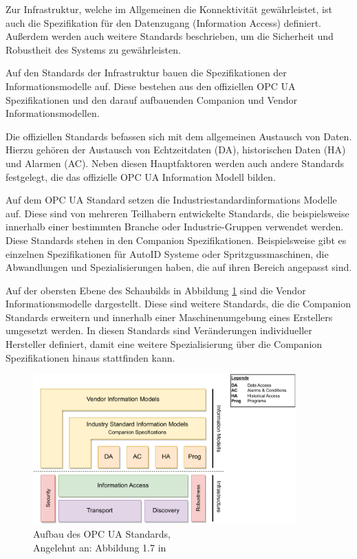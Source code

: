 \documentclass[a4paper, 12pt, oneside, toc=listofnumbered, bibliography=totoc]{scrbook}
\begin{document}
		Zur Infrastruktur, welche im Allgemeinen die Konnektivität gewährleistet, ist auch die Spezifikation für den Datenzugang (Information Access) definiert. Außerdem werden auch weitere Standards beschrieben, um die Sicherheit und Robustheit des Systems zu gewährleisten.
		
		Auf den Standards der Infrastruktur bauen die Spezifikationen der Informationsmodelle auf. Diese bestehen aus den offiziellen OPC UA Spezifikationen und den darauf aufbauenden Companion und Vendor Informationsmodellen. \cite{mahnke_opc_2009}
		
		Die offiziellen Standards befassen sich mit dem allgemeinen Austausch von Daten. Hierzu gehören der Austausch von Echtzeitdaten (DA), historischen Daten (HA) und Alarmen (AC). Neben diesen Hauptfaktoren werden auch andere Standards festgelegt, die das offizielle OPC UA Information Modell bilden. \cite{mahnke_opc_2009, rinke_was_2022}
		
		Auf dem OPC UA Standard setzen die Industriestandardinformations Modelle auf. Diese sind von mehreren Teilhabern entwickelte Standards, die beispielsweise innerhalb einer bestimmten Branche oder Industrie-Gruppen verwendet werden. Diese Standards stehen in den Companion Spezifikationen. Beispielsweise gibt es einzelnen Spezifikationen für AutoID Systeme oder Spritzgussmaschinen, die Abwandlungen und Spezialisierungen haben, die auf ihren Bereich angepasst sind. \cite{mahnke_opc_2009, rinke_was_2022}
		
		Auf der obersten Ebene des Schaubilds in Abbildung \ref{fig:OPCUA_Framework} sind die Vendor Informationsmodelle dargestellt. Diese sind weitere Standards, die die Companion Standards erweitern und innerhalb einer Maschinenumgebung eines Erstellers umgesetzt werden. In diesen Standards sind Veränderungen individueller Hersteller definiert, damit eine weitere Spezialisierung über die Companion Spezifikationen hinaus stattfinden kann. \cite{mahnke_opc_2009, rinke_was_2022}
		
		
		\begin{figure}[H]
			\centering
			\includegraphics[width=0.9\textwidth]{res/diagramms/companionSpezifikations.pdf}
			\caption{Aufbau des OPC UA Standards, \\ Angelehnt an: Abbildung 1.7 in \cite{mahnke_opc_2009}}
			\label{fig:OPCUA_Framework}
		\end{figure}
	
\end{document}
